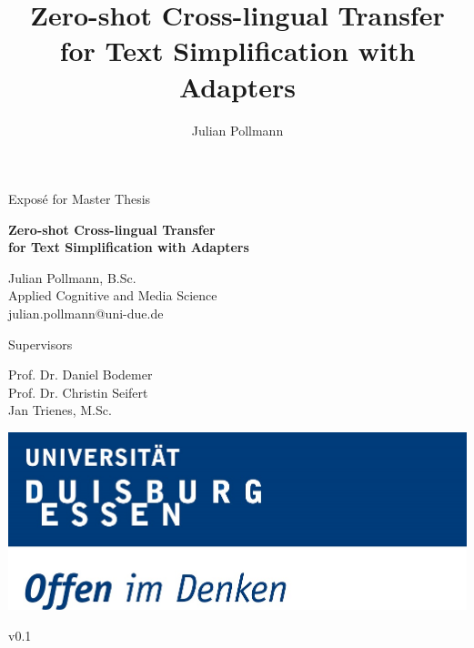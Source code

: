 \documentclass[acmlarge,screen,nonacm]{acmart}
\begin{document}
\title{Zero-shot Cross-lingual Transfer for Text Simplification with Adapters}

\author{Julian Pollmann}

\begin{titlepage}

  \begin{center}
    \Large{Exposé for Master Thesis}
  \end{center}

  \begin{center}
    \vspace{0.03\textheight}
    \begin{huge}
      \textbf{Zero-shot Cross-lingual Transfer\\ for Text Simplification with Adapters}
    \end{huge}

    \vspace{0.03\textheight}
    \Large{Julian Pollmann, B.Sc. \\
    Applied Cognitive and Media Science \\
    julian.pollmann@uni-due.de }

    \vspace{0.5\textheight}
  \end{center}


  \begin{center}

    \Large{Supervisors}

    \Large{Prof. Dr. Daniel Bodemer\\}
    \Large{Prof. Dr. Christin Seifert\\}
    \Large{Jan Trienes, M.Sc.\\}

    \vspace{0.03\textheight}

    \includegraphics[height=15ex]{./figures/ude-logo.jpg}\\

    \vfill

    \normalsize{v0.1}
  \end{center}

\end{titlepage}








\end{document}
